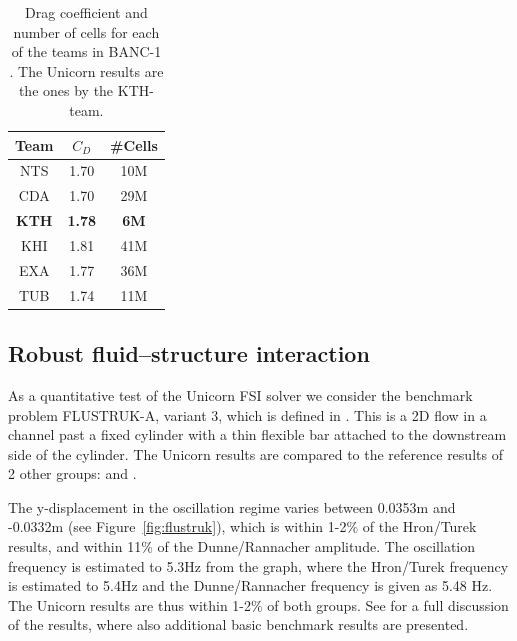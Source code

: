 \begin{table}[hbt]
\begin{center}
\begin{tabular}{|c|cc|}
\hline
Team & $C_D$ & \#Cells \\
\hline
NTS &    1.70 &    10M \\
CDA  &   1.70  &   29M \\
\textbf{KTH}  &   \textbf{1.78}  &   \textbf{6M}\\
KHI  &   1.81  &   41M \\
EXA  &   1.77  &   36M \\
TUB  &   1.74  &   11M \\
\hline
\end{tabular}
\caption{\label{tab:hoffman-1-rlg} Drag coefficient and number of cells for each of the teams in BANC-1 \citep{SpalartMejia2011}. The Unicorn results are the ones by the KTH-team.}
\end{center}
\end{table}

\subsection{Robust fluid--structure interaction}

As a quantitative test of the Unicorn FSI solver we consider the benchmark problem FLUSTRUK-A, variant 3, which is defined in \citet{HronTurek2005}. This is a 2D flow in a channel past a fixed cylinder with a thin flexible bar attached to the downstream side of the cylinder. The Unicorn results are compared to the reference results of 2 other groups: \citet{HronTurek2005} and \citet{DunneRannacher2006}.

The y-displacement in the oscillation regime varies between 0.0353m and -0.0332m (see Figure~\ref{fig:flustruk}), which is within 1-2\% of the Hron/Turek results, and within 11\% of the Dunne/Rannacher amplitude. The oscillation frequency is estimated to 5.3Hz from the graph, where the Hron/Turek frequency is estimated to 5.4Hz and the Dunne/Rannacher frequency is given as 5.48 Hz. The Unicorn results are thus within 1-2\% of both groups. See \citet{HoffmanJanssonStockli2011} for a full discussion of the results, where also additional basic benchmark results are presented.

